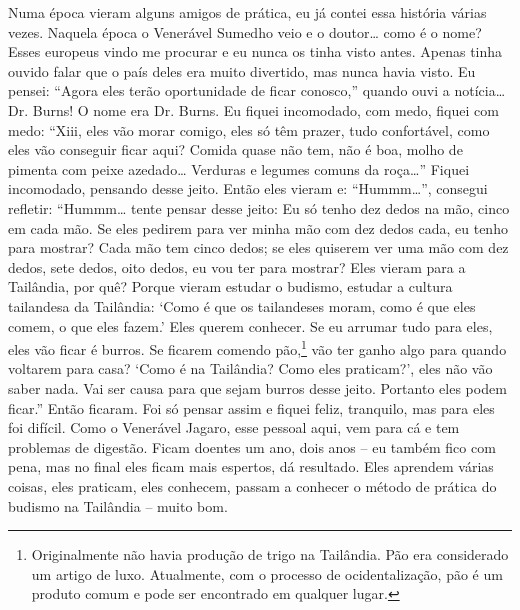 Numa época vieram alguns amigos de prática, eu já contei essa
história várias vezes. Naquela época o Venerável Sumedho veio e o
doutor\ldots{} como é o nome? Esses europeus vindo me procurar e eu nunca os
tinha visto antes. Apenas tinha ouvido falar que o país deles era muito
divertido, mas nunca havia visto. Eu pensei: “Agora eles terão
oportunidade de ficar conosco,” quando ouvi a notícia\ldots{} Dr. Burns! O
nome era Dr. Burns. Eu fiquei incomodado, com medo, fiquei com medo:
“Xiii, eles vão morar comigo, eles só têm prazer, tudo confortável,
como eles vão conseguir ficar aqui? Comida quase não tem, não é boa,
molho de pimenta com peixe azedado\ldots{} Verduras e legumes comuns da roça\ldots{}”
Fiquei incomodado, pensando desse jeito. Então eles vieram e: “Hummm\ldots{}”,
consegui refletir: “Hummm\ldots{} tente pensar desse jeito: Eu só tenho dez
dedos na mão, cinco em cada mão. Se eles pedirem para ver minha mão com
dez dedos cada, eu tenho para mostrar? Cada mão tem cinco dedos; se
eles quiserem ver uma mão com dez dedos, sete dedos, oito dedos, eu vou
ter para mostrar? Eles vieram para a Tailândia, por quê? Porque vieram
estudar o budismo, estudar a cultura tailandesa da Tailândia: ‘Como é
que os tailandeses moram, como é que eles comem, o que eles fazem.’
Eles querem conhecer. Se eu arrumar tudo para eles, eles vão ficar é
burros. Se ficarem comendo pão,\footnote{Originalmente não havia
produção de trigo na Tailândia. Pão era considerado um artigo de luxo.
Atualmente, com o processo de ocidentalização, pão é um produto comum e
pode ser encontrado em qualquer lugar.} vão ter ganho algo para quando
voltarem para casa? ‘Como é na Tailândia? Como eles praticam?’, eles
não vão saber nada. Vai ser causa para que sejam burros desse jeito.
Portanto eles podem ficar.” Então ficaram. Foi só pensar assim e fiquei
feliz, tranquilo, mas para eles foi difícil. Como o Venerável Jagaro,
esse pessoal aqui, vem para cá e tem problemas de digestão. Ficam
doentes um ano, dois anos – eu também fico com pena, mas no final eles
ficam mais espertos, dá resultado. Eles aprendem várias coisas, eles
praticam, eles conhecem, passam a conhecer o método de prática do
budismo na Tailândia – muito bom. 

